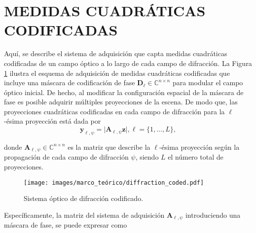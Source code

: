 

\section{MEDIDAS CUADRÁTICAS CODIFICADAS}
Aquí, se describe el sistema de adquisición que capta medidas cuadráticas codificadas de un campo óptico a lo largo de cada campo de difracción. La Figura \ref{fig:coded_difraction_systems} ilustra el esquema de adquisición de medidas cuadráticas codificadas que incluye una máscara de codificación de fase $\mathbf{D}_\ell \in \mathbb{C}^{n\times n}$ para modular el campo óptico inicial. De hecho, al modificar la configuración espacial de la máscara de fase es posible adquirir múltiples proyecciones de la escena. De modo que, las proyecciones cuadráticas codificadas en cada campo de difracción para la $\ell$-ésima proyección está dada por 
\begin{equation}
    \mathbf{y}_{\ell, \psi} = \vert \mathbf{A}_{\ell, \psi}\mathbf{z} \vert, \ell=\{1,\dots,L\},
    \label{eq:phase_retrieval_problem}
\end{equation}

donde $\mathbf{A}_{\ell, \psi}\in\mathbb{C}^{n\times n}$ es la matriz que describe la $\ell$-ésima proyección según la propagación de cada campo de difracción $\psi$, siendo $L$ el número total de proyecciones. 
\begin{figure}[!h]
    \centering
    \caption{\hspace{2mm}Sistema óptico de difracción codificado.}
    \texttt{[image: images/marco\_teórico/diffraction\_coded.pdf]}
    \label{fig:coded_difraction_systems}
\end{figure}

Específicamente, la matriz del sistema de adquisición $\mathbf{A}_{\ell, \psi}$ introduciendo una máscara de fase, se puede expresar como

